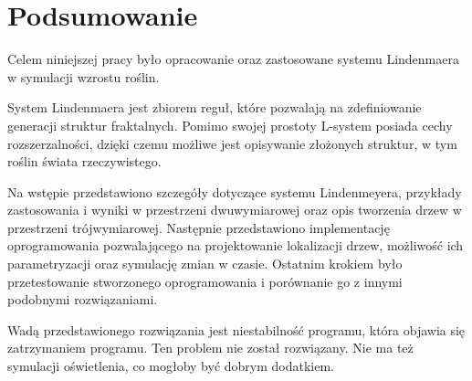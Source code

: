 \documentclass[a4paper,twoside,12pt]{report}
\begin{document}
\chapter*{Podsumowanie}

Celem niniejszej pracy było opracowanie oraz 
zastosowane systemu Lindenmaera w symulacji
wzrostu roślin.

System Lindenmaera jest zbiorem reguł, które pozwalają na 
zdefiniowanie generacji struktur fraktalnych. Pomimo 
swojej prostoty L-system posiada cechy rozszerzalności, 
dzięki czemu możliwe jest opisywanie złożonych struktur, 
w tym roślin świata rzeczywistego.

Na wstępie przedstawiono szczegóły dotyczące systemu Lindenmeyera, 
przykłady zastosowania i wyniki w przestrzeni dwuwymiarowej oraz 
opis tworzenia drzew w przestrzeni trójwymiarowej. 
Następnie przedstawiono implementację oprogramowania 
pozwalającego na projektowanie lokalizacji drzew, 
możliwość ich parametryzacji oraz symulację zmian w czasie.
Ostatnim krokiem było przetestowanie stworzonego oprogramowania 
i porównanie go z innymi podobnymi rozwiązaniami.

Wadą przedstawionego rozwiązania jest niestabilność programu, 
która objawia się zatrzymaniem programu. 
Ten problem nie został rozwiązany.
Nie ma też symulacji oświetlenia, co mogłoby być dobrym dodatkiem.



\end{document}
